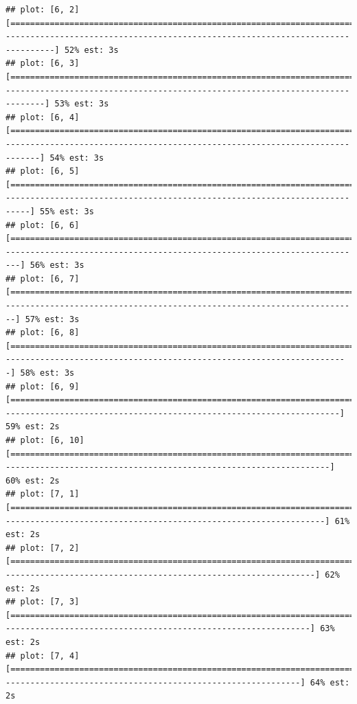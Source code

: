 \documentclass[
]{article}
\begin{document}
\begin{verbatim}
## plot: [6, 2] [=======================================================================================>---------------------------------------------------------------------------------] 52% est: 3s 
## plot: [6, 3] [=========================================================================================>-------------------------------------------------------------------------------] 53% est: 3s 
## plot: [6, 4] [==========================================================================================>------------------------------------------------------------------------------] 54% est: 3s 
## plot: [6, 5] [============================================================================================>----------------------------------------------------------------------------] 55% est: 3s 
## plot: [6, 6] [==============================================================================================>--------------------------------------------------------------------------] 56% est: 3s 
## plot: [6, 7] [===============================================================================================>-------------------------------------------------------------------------] 57% est: 3s 
## plot: [6, 8] [=================================================================================================>-----------------------------------------------------------------------] 58% est: 3s 
## plot: [6, 9] [===================================================================================================>---------------------------------------------------------------------] 59% est: 2s 
## plot: [6, 10] [====================================================================================================>-------------------------------------------------------------------] 60% est: 2s 
## plot: [7, 1] [======================================================================================================>------------------------------------------------------------------] 61% est: 2s 
## plot: [7, 2] [========================================================================================================>----------------------------------------------------------------] 62% est: 2s 
## plot: [7, 3] [=========================================================================================================>---------------------------------------------------------------] 63% est: 2s 
## plot: [7, 4] [===========================================================================================================>-------------------------------------------------------------] 64% est: 2s 

\end{verbatim}
\end{document}
